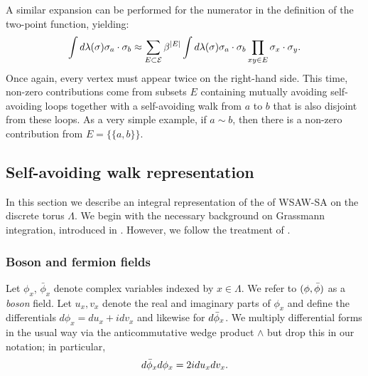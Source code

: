 
A similar expansion can be performed for the numerator in the definition of the
two-point function, yielding:
\begin{equation}
\int d\lambda(\sigma) \sigma_a \cdot \sigma_b
	\approx
\sum_{E\subset\mathcal{E}} \beta^{|E|}
\int d\lambda(\sigma) \sigma_a \cdot \sigma_b
\prod_{xy\in E} \sigma_x \cdot \sigma_y.
\end{equation}
Once again, every vertex must appear twice on the right-hand side. This time,
non-zero contributions come from subsets $E$ containing mutually avoiding self-avoiding
loops together with a self-avoiding walk from $a$ to $b$ that is also disjoint from these
loops. As a very simple example, if $a \sim b$, then there is a non-zero contribution from
$E = \{ \{ a, b \} \}$.




\subsection{Self-avoiding walk representation}
\label{sec:intrep}

In this section we describe an integral representation of the of WSAW-SA
on the discrete torus $\Lambda$. We begin with the necessary
background on Grassmann integration, introduced in \cite{Bere66}. However, we
follow the treatment of \cite{BIS09}.

\subsubsection{Boson and fermion fields}
\label{sec:forms}

Let $\phi_x$, $\bar\phi_x$ denote complex variables indexed by $x\in\Lambda$.
We refer to $(\phi, \bar\phi)$ as a \emph{boson} field. Let $u_x, v_x$ denote
the real and imaginary parts of $\phi_x$ and define the differentials
$d\phi_x = du_x + i dv_x$ and likewise for $d\bar\phi_x$.
We multiply differential forms in the usual way via the anticommutative wedge product
$\wedge$ but drop this in our notation; in particular,
\begin{equation}
d\bar\phi_x d\phi_x = 2 i du_x dv_x.
\end{equation}

